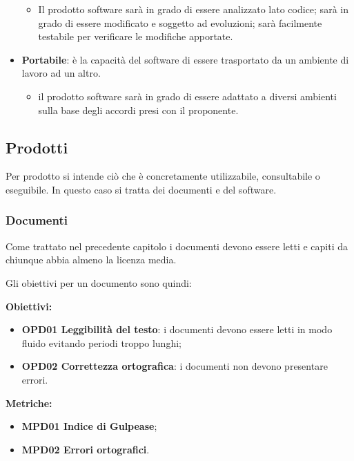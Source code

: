 \documentclass[../piano_di_qualifica.tex]{subfiles}
\begin{document}
\begin{itemize}
	      \begin{itemize}
		      \item Il prodotto software sarà in grado di essere analizzato lato codice; sarà in grado di essere modificato e soggetto ad evoluzioni; sarà facilmente testabile per verificare le modifiche apportate.
	      \end{itemize}
	\item \textbf{Portabile}: è la capacità del software di essere trasportato da un ambiente di lavoro ad un altro.
	      \begin{itemize}
		      \item il prodotto software sarà in grado di essere adattato a diversi ambienti sulla base degli accordi presi con il proponente.
	      \end{itemize}
\end{itemize}

\subsection{Prodotti}
Per prodotto si intende ciò che è concretamente utilizzabile, consultabile o eseguibile. In questo caso si tratta dei documenti e del software.

\subsubsection{Documenti}
Come trattato nel precedente capitolo i documenti devono essere letti e capiti da chiunque abbia almeno la licenza media.

Gli obiettivi per un documento sono quindi:

\setlength{\parindent}{0pt}\textbf{Obiettivi:}
\smallbreak
\begin{itemize}
	\item \textbf{OPD01 Leggibilità del testo}: i documenti devono essere letti in modo fluido evitando periodi troppo lunghi;
	\item \textbf{OPD02 Correttezza ortografica}: i documenti non devono presentare errori.
\end{itemize}

\textbf{Metriche:}
\smallbreak
\begin{itemize}
	\item \textbf{MPD01 Indice di Gulpease};
	\item \textbf{MPD02 Errori ortografici}.
\end{itemize}
\end{document}
